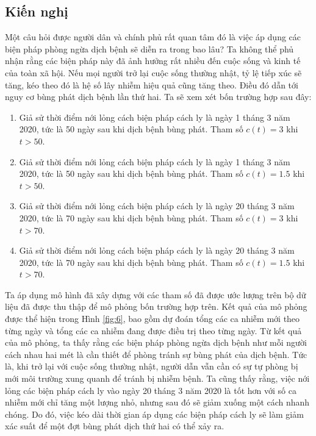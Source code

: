 \documentclass[../main.tex]{subfiles}
\begin{document}
\subsection{Kiến nghị}
Một câu hỏi được người dân và chính phủ rất quan tâm đó là việc áp dụng các biện pháp phòng ngừa dịch bệnh sẽ diễn ra trong bao lâu? Ta không thể phủ nhận rằng các biện pháp này đã ảnh hưởng rất nhiều đến cuộc sống và kinh tế của toàn xã hội. Nếu mọi người trở lại cuộc sống thường nhật, tỷ lệ tiếp xúc sẽ tăng, kéo theo đó là hệ số lây nhiễm hiệu quả cũng tăng theo. Điều đó dẫn tới nguy cơ bùng phát dịch bệnh lần thứ hai. Ta sẽ xem xét bốn trường hợp sau đây:
\begin{enumerate}[label=\textbf{\arabic*})]
    \item Giả sử thời điểm nới lỏng cách biện pháp cách ly là ngày 1 tháng 3 năm 2020, tức là 50 ngày sau khi dịch bệnh bùng phát. Tham số $c(t)=3$ khi $t>50$.
    \item Giả sử thời điểm nới lỏng cách biện pháp cách ly là ngày 1 tháng 3 năm 2020, tức là 50 ngày sau khi dịch bệnh bùng phát. Tham số $c(t)=1.5$ khi $t>50$.
    \item Giả sử thời điểm nới lỏng cách biện pháp cách ly là ngày 20 tháng 3 năm 2020, tức là 70 ngày sau khi dịch bệnh bùng phát. Tham số $c(t)=3$ khi $t>70$.
    \item Giả sử thời điểm nới lỏng cách biện pháp cách ly là ngày 20 tháng 3 năm 2020, tức là 70 ngày sau khi dịch bệnh bùng phát. Tham số $c(t)=1.5$ khi $t>70$.
\end{enumerate}
Ta áp dụng mô hình đã xây dựng với các tham số đã được ước lượng trên bộ dữ liệu đã được thu thập để mô phỏng  bốn trường hợp trên. Kết quả của mô phỏng được thể hiện trong Hình \ref{fig:6}, bao gồm dự đoán tổng các ca nhiễm mới theo từng ngày và tổng các ca nhiễm đang được điều trị theo từng ngày. Từ kết quả của mô phỏng, ta thấy rằng các biện pháp phòng ngừa dịch bệnh như mỗi người cách nhau hai mét là cần thiết để phòng tránh sự bùng phát của dịch bệnh. Tức là, khi trở lại với cuộc sống thường nhật, người dẫn vẫn cần có sự tự phòng bị mới môi trường xung quanh để tránh bị nhiễm bệnh. Ta cũng thấy rằng, việc nới lỏng các biện pháp cách ly vào ngày 20 tháng 3 năm 2020 là tốt hơn với số ca nhiễm mới chỉ tăng một lượng nhỏ, nhưng sau đó sẽ giảm xuống một cách nhanh chóng. Do đó, việc kéo dài thời gian áp dụng các biện pháp cách ly sẽ làm giảm xác suất để một đợt bùng phát dịch thứ hai có thể xảy ra.
\end{document}
